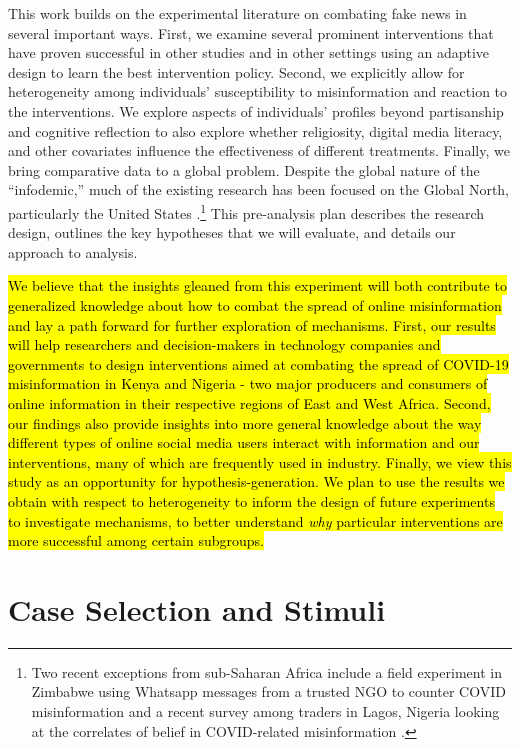 \documentclass[letterpaper, 12pt, parskip=full,]{scrartcl}
\begin{document}
This work builds on the experimental literature on combating fake news in several important ways. First, we examine several prominent interventions that have proven successful in other studies and in other settings using an adaptive design to learn the best intervention policy. Second, we explicitly allow for heterogeneity among individuals' susceptibility to misinformation and reaction to the interventions. We explore aspects of individuals' profiles beyond partisanship and cognitive reflection to also explore whether religiosity, digital media literacy, and other covariates influence the effectiveness of different treatments. Finally, we bring comparative data to a global problem. Despite the global nature of the ``infodemic,'' much of the existing research has been focused on the Global North, particularly the United States \citep{pennycook2020fighting, bursztyn2020misinformation}.\footnote{Two recent exceptions from sub-Saharan Africa include a field experiment in Zimbabwe using Whatsapp messages from a trusted NGO  to counter COVID misinformation \citep{bowles2020center} and a recent survey among traders in Lagos, Nigeria looking at the correlates of belief in COVID-related misinformation \citep{Grossman2020}.} This pre-analysis plan describes the research design, outlines the key hypotheses that we will evaluate, and details our approach to analysis.

\hl{We believe that the insights gleaned from this experiment will both contribute to generalized knowledge about how to combat the spread of online misinformation and lay a path forward for further exploration of mechanisms. First, our results will help researchers and decision-makers in technology companies and governments to design interventions aimed at combating the spread of COVID-19 misinformation in Kenya and Nigeria - two major producers and consumers of online information in their respective regions of East and West Africa. Second, our findings also provide insights into more general knowledge about the way different types of online social media users interact with information and our interventions, many of which are frequently used in industry. Finally, we view this study as an opportunity for hypothesis-generation. We plan to use the results we obtain with respect to heterogeneity to inform the design of future experiments to investigate mechanisms, to better understand \textit{why} particular interventions are more successful among certain subgroups.}


\section{Case Selection and Stimuli}
\end{document}
